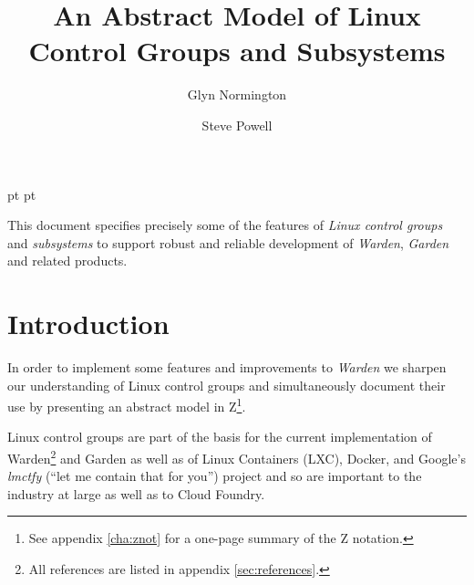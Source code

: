 \documentclass[a4paper,twoside,12pt]{article}
\begin{document}
 pt
 pt

\def\Slash{\slash\hspace{0pt}}

\title{An Abstract Model of Linux Control Groups and Subsystems}

\author{
Glyn Normington\and
Steve Powell
}

\maketitle
\thispagestyle{myheadings}
\setcounter{page}{1}


This document specifies precisely some of the features of \emph{Linux control groups} and \emph{subsystems} to support robust and reliable development of \emph{Warden}, \emph{Garden} and related products.


\newcommand{\true}{true}
\newcommand{\false}{false}
\renewcommand{\emptyset}{\varnothing}

\clearpage
\tableofcontents

\cleardoublepage
{}

\section{Introduction}

In order to implement some features and improvements to \emph{Warden} we sharpen our understanding of Linux control groups
and simultaneously document their use by presenting an abstract model in Z\footnote{See appendix \ref{cha:znot} for a one-page summary of the Z notation.}.

Linux control groups are part of the basis for the current implementation of Warden\cite{warden}\footnote{All references are listed in appendix \ref{sec:references}.} and Garden\cite{garden} as well as of Linux Containers (LXC), Docker, and Google's
\textit{lmctfy} (``let me contain that for you'') project and so are important to the industry at large as well as to Cloud
Foundry.
\end{document}
